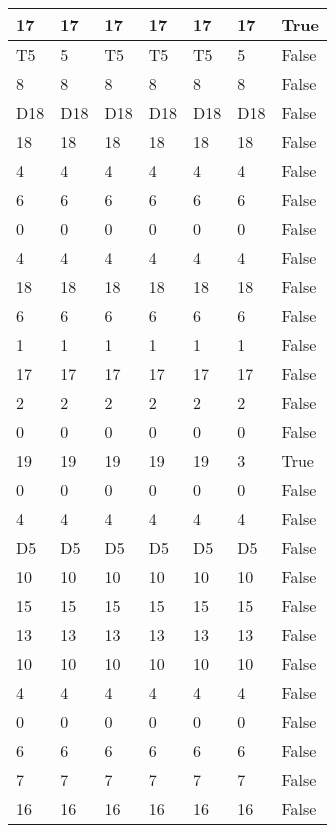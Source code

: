 \begin{longtable}[htbp]{| p{} | p{} | p{}| p{}| p{}| p{}| p{}|}
17 & 17 & 17 & 17 & 17 & 17 & True \\ \hline
\multicolumn{1}{|l|}{T5} & 5 & \multicolumn{1}{l|}{T5} & \multicolumn{1}{l|}{T5} & \multicolumn{1}{l|}{T5} & 5 & False \\ \hline
8 & 8 & 8 & 8 & 8 & 8 & False \\ \hline
\multicolumn{1}{|l|}{D18} & \multicolumn{1}{l|}{D18} & \multicolumn{1}{l|}{D18} & \multicolumn{1}{l|}{D18} & \multicolumn{1}{l|}{D18} & \multicolumn{1}{l|}{D18} & False \\ \hline
18 & 18 & 18 & 18 & 18 & 18 & False \\ \hline
4 & 4 & 4 & 4 & 4 & 4 & False \\ \hline
6 & 6 & 6 & 6 & 6 & 6 & False \\ \hline
0 & 0 & 0 & 0 & 0 & 0 & False \\ \hline
4 & 4 & 4 & 4 & 4 & 4 & False \\ \hline
18 & 18 & 18 & 18 & 18 & 18 & False \\ \hline
6 & 6 & 6 & 6 & 6 & 6 & False \\ \hline
1 & 1 & 1 & 1 & 1 & 1 & False \\ \hline
17 & 17 & 17 & 17 & 17 & 17 & False \\ \hline
2 & 2 & 2 & 2 & 2 & 2 & False \\ \hline
0 & 0 & 0 & 0 & 0 & 0 & False \\ \hline
19 & 19 & 19 & 19 & 19 & 3 & True \\ \hline
0 & 0 & 0 & 0 & 0 & 0 & False \\ \hline
4 & 4 & 4 & 4 & 4 & 4 & False \\ \hline
\multicolumn{1}{|l|}{D5} & \multicolumn{1}{l|}{D5} & \multicolumn{1}{l|}{D5} & \multicolumn{1}{l|}{D5} & \multicolumn{1}{l|}{D5} & \multicolumn{1}{l|}{D5} & False \\ \hline
10 & 10 & 10 & 10 & 10 & 10 & False \\ \hline
15 & 15 & 15 & 15 & 15 & 15 & False \\ \hline
13 & 13 & 13 & 13 & 13 & 13 & False \\ \hline
10 & 10 & 10 & 10 & 10 & 10 & False \\ \hline
4 & 4 & 4 & 4 & 4 & 4 & False \\ \hline
0 & 0 & 0 & 0 & 0 & 0 & False \\ \hline
6 & 6 & 6 & 6 & 6 & 6 & False \\ \hline
7 & 7 & 7 & 7 & 7 & 7 & False \\ \hline
16 & 16 & 16 & 16 & 16 & 16 & False \\ \hline

\end{longtable}
